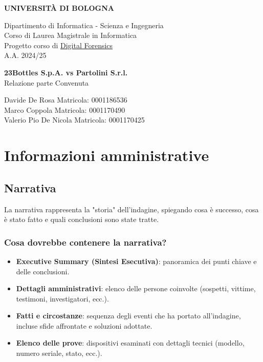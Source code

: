 \documentclass[a4paper,12pt]{report}
\begin{document}
\begin{titlepage}
    \centering
    \vspace*{0.1cm}

    \Huge
    \textbf{UNIVERSITÀ DI BOLOGNA}

    \vspace{1cm}
    \Large
    Dipartimento di Informatica - Scienza e Ingegneria \\
    Corso di Laurea Magistrale in Informatica \\\vspace{1cm}
    Progetto corso di \href{https://www.unibo.it/it/studiare/dottorati-master-specializzazioni-e-altra-formazione/insegnamenti/insegnamento/2024/479039}{Digital Forensics} \\
    A.A. 2024/25

    \vspace{5.5cm}
    \textbf{\LARGE 23Bottles S.p.A. vs Partolini S.r.l.}\\\vspace{0.3cm}
    \Large Relazione parte Convenuta

    \vfill

    \vfill

    \large
    Davide De Rosa \hfill Matricola: 0001186536\\
    Marco Coppola \hfill Matricola: 0001170490\\
    Valerio Pio De Nicola \hfill Matricola: 0001170425\\
\end{titlepage}

\tableofcontents
\newpage

\chapter{Informazioni amministrative}


\pagebreak

\section{Narrativa}
La narrativa rappresenta la "storia" dell'indagine, spiegando cosa è successo, cosa è stato fatto e quali conclusioni sono state tratte.

\subsection{Cosa dovrebbe contenere la narrativa?}
\begin{itemize}
    \item \textbf{Executive Summary (Sintesi Esecutiva)}: panoramica dei punti chiave e delle conclusioni.
    \item \textbf{Dettagli amministrativi}: elenco delle persone coinvolte (sospetti, vittime, testimoni, investigatori, ecc.).
    \item \textbf{Fatti e circostanze}: sequenza degli eventi che ha portato all'indagine, incluse sfide affrontate e soluzioni adottate.
    \item \textbf{Elenco delle prove}: dispositivi esaminati con dettagli tecnici (modello, numero seriale, stato, ecc.).
\end{itemize}
\end{document}
